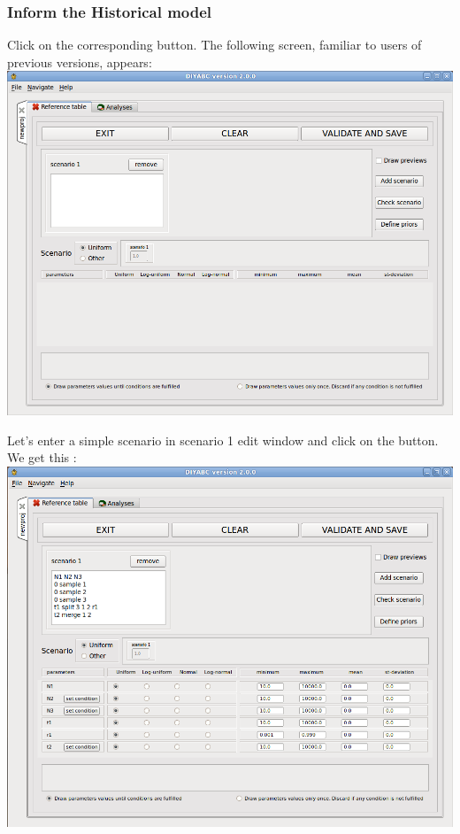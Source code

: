  \newpage
\subsubsection{Inform the Historical model}
Click on the corresponding  button. The following screen, familiar to users of previous versions, appears:\\

\includegraphics[scale=0.35]{gui_pictures/Capture-DIYABC-11.png} 

Let's enter a simple scenario in scenario 1 edit window and click on the  button. We get this :\\

\includegraphics[scale=0.35]{gui_pictures/Capture-DIYABC-12.png} 


